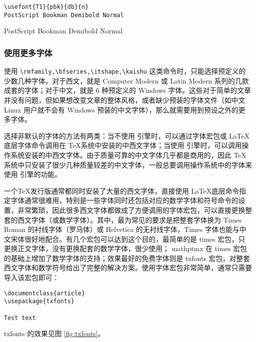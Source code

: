 \begin{minipage}[t]{0.45\textwidth}
\begin{lstlisting}
\usefont{T1}{pbk}{db}{n}
PostScript Bookman Demibold Normal
\end{lstlisting}
\end{minipage}
\hfill
\begin{minipage}[t]{0.45\textwidth}
    PostScript Bookman Demibold Normal
\end{minipage}

\subsubsection{使用更多字体}

使用 \verb|\rmfamily,\bfseries,\itshape,\kaishu| 这类命令时，只能选择预定义的少数几种字体。对于西文，就是 Computer Modern 或 Latin Modern 系列的几款成套的字体；对于中文，就是 6 种预定义的 Windows 字体。这些对于简单的文章并没有问题，但如果想改变文章的整体风格，或者缺少预装的字体文件（如中文 Linux 用户就不会有 Windows 预装的中文字体），那么就需要用到预设之外的更多字体。

选择非默认的字体的方法有两类：当不使用 \XeTeX 引擎时，可以通过字体宏包或 \LaTeX 底层字体命令调用在 \TeX 系统中安装的中西文字体；当使用 \XeTeX 引擎时，可以调用操作系统安装的中西文字体。由于质量可靠的中文字体几乎都是商用的，因此 \TeX 系统中只安装了很少几种质量较差的中文字体，一般总要调用操作系统中的字体来使用 \XeTeX 引擎的功能。

一个\TeX 发行版通常都同时安装了大量的西文字体，直接使用 \LaTeX 底层命令指定字体通常很难用，特别是一些字体同时还包括对应的数学字体和符号命令的设置，非常繁琐，因此很多西文字体都做成了方便调用的字体宏包，可以直接更换整套的西文字体（或数学字体）。其中，最为常见的要求是把整套字体换为 Times Roman 的衬线字体（罗马体）或  Helvetica 的无衬线字体，Times 字体也能与中文宋体很好地配合。有几个宏包可以达到这个目的，最简单的是 times 宏包，只更换正文字体，没有更换配套的数学字体，很少使用； mathptmx 在 times 宏包的基础上增加了数学字体的支持；效果最好的免费字体则是 txfonts 宏包，对整套西文字体和数学符号给出了完整的解决方案。使用字体宏包非常简单，通常只需要导入该宏包即可：

\begin{lstlisting}
\documentclass{article}
\usepackage{txfonts}

Test text

\end{lstlisting}

txfonts 的效果见图 \ref{fig:txfonts}。

